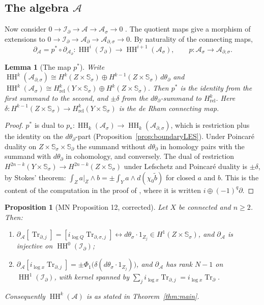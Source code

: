 \documentclass[11pt,oneside,reqno]{article}
\DeclareMathOperator{\HH}{HH}
\DeclareMathOperator{\Tr}{Tr}
\newcommand{\cA}{\mathcal A}
\newcommand{\Id}{\mathcal I_\partial}
\newcommand{\As}{\mathcal A_\sigma}
\newcommand{\Ad}{\mathcal A_\partial}
\newcommand{\Ads}{\mathcal A_{\partial,\sigma}}
\newcommand{\Trd}{\Tr_\partial}
\newcommand{\Ssig}{\mathbb S_\sigma}
\newcommand{\Sd}{\mathbb S_\partial}
\newcommand{\Hrel}{H_{\mathrm{rel}}}
\newcommand{\lQ}{\log Q}
\newcommand{\lx}{\log x}
\theoremstyle{plain}
\newtheorem{proposition}[theorem]{Proposition}
\newtheorem{lemma}[theorem]{Lemma}
\theoremstyle{definition}
\theoremstyle{remark}
\begin{document}
\subsection{The algebra \texorpdfstring{\(\cA\)}{A}}
Now consider \(0\to\Id\to\cA\to\As\to0\) \cite[(77)]{MN}. The quotient
maps give a morphism of extensions to \(0\to\Id\to\Ad\to\Ads\to0\). By
naturality of the connecting maps,
\begin{equation}\label{eq:natural}
 \partial_{\cA}=p^*\circ\partial_{\Ad}:\HH^i(\Id)\to\HH^{i+1}(\As),
 \qquad p:\As\to\Ads .
\end{equation}

\begin{lemma}[The map \(p^*\)]\label{lem:pstar}
Write \(\HH^k(\Ads)\cong H^k(Z\times\Ssig)\oplus H^{k-1}(Z\times\Ssig)\,
d\theta_\partial\) and \(\HH^k(\As)\cong\Hrel^k(Y\times\Ssig)\oplus
H^k(Z\times\Ssig)\). Then \(p^*\) is the identity from the first summand
to the second, and \(\pm\delta\) from the \(d\theta_\partial\)-summand to
\(\Hrel^k\). Here \(\delta:H^{k-1}(Z\times\Ssig)\to\Hrel^k(Y\times\Ssig)\)
is the de Rham connecting map.
\end{lemma}

\begin{proof}
\(p^*\) is dual to \(p_*:\HH_k(\As)\to\HH_k(\Ads)\), which is restriction
plus the identity on the \(d\theta_\partial\)-part
(Proposition~\ref{prop:boundaryLES}). Under Poincar\'e duality on
\(Z\times\Ssig\times\Sd\) the summand without \(d\theta_\partial\) in
homology pairs with the summand with \(d\theta_\partial\) in cohomology, and
conversely. The dual of restriction \(H^{2n-k}(Y\times\Ssig)\to
H^{2n-k}(Z\times\Ssig)\) under Lefschetz and Poincar\'e duality is
\(\pm\delta\), by Stokes' theorem:
\(\int_{Z}a|_Z\wedge b=\pm\int_Y a\wedge d(\chi_0\tilde b)\) for closed
\(a\) and \(b\). This is the content of the computation in the proof of
\cite[Prop.~12]{MN}, where it is written \(i\oplus(-1)^q\partial\).
\end{proof}

\begin{proposition}[MN Proposition 12, corrected]\label{prop:HHA}
Let \(X\) be connected and \(n\ge2\). Then:
\begin{enumerate}
\item \(\partial_{\cA}[\Tr_{\partial,j}]=[i_{\lQ}\Tr_{\partial,\sigma,j}]
\leftrightarrow d\theta_\sigma\cdot1_{Z_j}\in H^1(Z\times\Ssig)\), and
\(\partial_{\cA}\) is injective on \(\HH^0(\Id)\);
\item \(\partial_{\cA}[i_{\lx}\Tr_{\partial,j}]=\pm\Phi_1\bigl(\delta
(d\theta_\sigma\cdot1_{Z_j})\bigr)\), and \(\partial_{\cA}\) has rank
\(N-1\) on \(\HH^1(\Id)\), with kernel spanned by
\(\sum_ji_{\lx}\Tr_{\partial,j}=i_{\lx}\Trd\).
\end{enumerate}
Consequently \(\HH^k(\cA)\) is as stated in Theorem~\ref{thm:main}.
\end{proposition}
\end{document}
